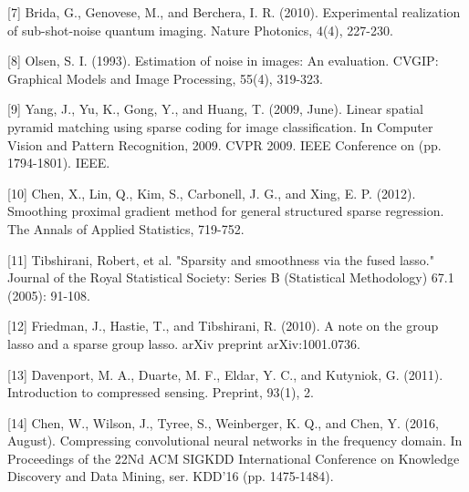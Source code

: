 \documentclass{article}
\begin{document}
[7] Brida, G., Genovese, M., and Berchera, I. R. (2010). Experimental realization of sub-shot-noise quantum imaging. Nature Photonics, 4(4), 227-230.

[8] Olsen, S. I. (1993). Estimation of noise in images: An evaluation. CVGIP: Graphical Models and Image Processing, 55(4), 319-323.

[9] Yang, J., Yu, K., Gong, Y., and Huang, T. (2009, June). Linear spatial pyramid matching using sparse coding for image classification. In Computer Vision and Pattern Recognition, 2009. CVPR 2009. IEEE Conference on (pp. 1794-1801). IEEE.

[10] Chen, X., Lin, Q., Kim, S., Carbonell, J. G., and Xing, E. P. (2012). Smoothing proximal gradient method for general structured sparse regression. The Annals of Applied Statistics, 719-752.

[11] Tibshirani, Robert, et al. "Sparsity and smoothness via the fused lasso." Journal of the Royal Statistical Society: Series B (Statistical Methodology) 67.1 (2005): 91-108.

[12] Friedman, J., Hastie, T., and Tibshirani, R. (2010). A note on the group lasso and a sparse group lasso. arXiv preprint arXiv:1001.0736.

[13] Davenport, M. A., Duarte, M. F., Eldar, Y. C., and Kutyniok, G. (2011). Introduction to compressed sensing. Preprint, 93(1), 2.
 
[14] Chen, W., Wilson, J., Tyree, S., Weinberger, K. Q., and Chen, Y. (2016, August). Compressing convolutional neural networks in the frequency domain. In Proceedings of the 22Nd ACM SIGKDD International Conference on Knowledge Discovery and Data Mining, ser. KDD’16 (pp. 1475-1484).


\nocite{langley00}



\end{document}
